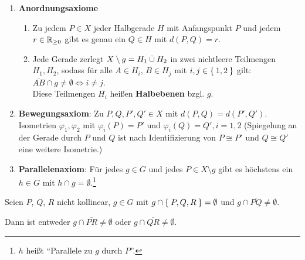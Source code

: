\begin{definition}
    \begin{enumerate}[label=§\arabic*),ref=§\arabic*,start=3]
        \item \label{axiom:3}\textbf{Anordnungsaxiome}
            \begin{enumerate}[label=(\roman*),ref=\theenumi{} (\roman*)]
                \item \label{axiom:3.1} Zu jedem $P \in X$ jeder 
                      Halbgerade $H$ mit Anfangspunkt $P$ und jedem 
                      $r \in \mathbb{R}_{\geq 0}$ gibt es genau ein 
                      $Q \in H$ mit $d(P,Q) = r$.
                \item \label{axiom:3.2} Jede Gerade zerlegt 
                      $X \setminus g = H_1 \mathbin{\dot{\cup}} H_2$ in zwei 
                      nichtleere Teilmengen $H_1, H_2$,
                      sodass für alle $A \in H_i$, $B \in H_j$ mit
                      $i,j \in \Set{1,2}$ gilt: 
                      $\overline{AB} \cap g \neq \emptyset \Leftrightarrow i \neq j$.\\
                      Diese Teilmengen $H_i$ heißen 
                      \textbf{Halbebenen} bzgl. 
                      $g$.
            \end{enumerate}
        \item \label{axiom:4}\textbf{Bewegungsaxiom}: Zu $P, Q, P', Q' \in X$
            mit $d(P,Q) = d(P', Q')$. Isometrien $\varphi_1, \varphi_2$
            mit $\varphi_i (P) = P'$ und $\varphi_i(Q) = Q', i=1,2$
            (Spiegelung an der Gerade durch $P$ und $Q$ ist nach 
             Identifizierung von $P \cong P'$ und $Q \cong Q'$ eine
             weitere Isometrie.)
        \item \label{axiom:5}\textbf{Parallelenaxiom}: Für jedes $g \in G$ und jedes
            $P \in X \setminus g$ gibt es höchstens ein $h \in G$ mit
            $h \cap g = \emptyset$.\footnote{$h$ heißt \enquote{Parallele zu $g$ durch $P$}.}
    \end{enumerate}
\end{definition}

\begin{satz}\label{satz:pasch} %
    Seien $P$, $Q$, $R$ nicht kollinear, $g \in G$ mit $g \cap \Set{P, Q, R} = \emptyset$
    und $g \cap \overline{PQ} \neq \emptyset$. 

    Dann ist entweder $g \cap \overline{PR} \neq \emptyset$ oder 
                      $g \cap \overline{QR} \neq \emptyset$.
\end{satz}

